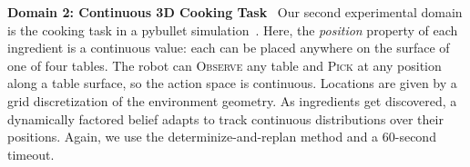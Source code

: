 \textbf{Domain 2: Continuous 3D Cooking Task} \ Our second
experimental domain is the cooking task in a pybullet
simulation~\cite{pybullet}. Here, the \emph{position} property of each
ingredient is a continuous value: each can be placed anywhere on the
surface of one of four tables. The robot can \textsc{Observe} any
table and \textsc{Pick} at any position along a table surface, so the
action space is continuous. Locations are given by a grid
discretization of the environment geometry. As ingredients get
discovered, a dynamically factored belief adapts to track continuous
distributions over their positions. Again, we use the
determinize-and-replan method and a 60-second timeout.

\begin{table}[t]
  \vspace{0.6em}
  \centering
\end{table}
